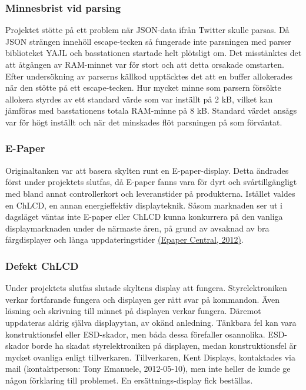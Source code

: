 \documentclass[a4paper,11pt]{article}
\begin{document}
\subsubsection{Minnesbrist vid parsing}
Projektet stötte på ett problem när JSON-data ifrån Twitter skulle parsas. Då JSON strängen innehöll escape-tecken så fungerade inte parsningen med parser biblioteket YAJL och basstationen startade helt plötsligt om. Det misstänktes det att åtgången av RAM-minnet var för stort och att detta orsakade omstarten. Efter undersökning av parserns källkod upptäcktes det att en buffer allokerades när den stötte på ett escape-tecken. Hur mycket minne som parsern försökte allokera styrdes av ett standard värde som var inställt på 2 kB, vilket kan jämföras med basstationens totala RAM-minne på 8 kB. Standard värdet ansågs var för högt inställt och när det minskades flöt parsningen på som förväntat.

\subsubsection{E-Paper}
Originaltanken var att basera skylten runt en E-paper-display. Detta ändrades först under projektets slutfas, då E-paper fanns vara för dyrt och svårtillgängligt med bland annat controllerkort och leveranstider på produkterna. Istället valdes en ChLCD, en annan energieffektiv displayteknik. Såsom marknaden ser ut i dagsläget väntas inte E-paper eller ChLCD kunna konkurrera på den vanliga displaymarknaden under de närmaste åren, på grund av avsaknad av bra färgdisplayer och långa uppdateringstider \hyperref[epapercentral]{(Epaper Central, 2012)}.

\subsubsection{Defekt ChLCD}
Under projektets slutfas slutade skyltens display att fungera. Styrelektroniken verkar fortfarande fungera och displayen ger rätt svar på kommandon. Även läsning och skrivning till minnet på displayen verkar fungera. Däremot uppdateras aldrig själva displayytan, av okänd anledning. Tänkbara fel kan vara konstruktionsfel eller ESD-skador, men båda dessa förefaller osannolika. ESD-skador borde ha skadat styrelektroniken på displayen, medan konstruktionsfel är mycket ovanliga enligt tillverkaren. Tillverkaren, Kent Displays, kontaktades via mail (kontaktperson: Tony Emanuele, 2012-05-10), men inte heller de kunde ge någon förklaring till problemet. En ersättnings-display fick beställas.
\end{document}
